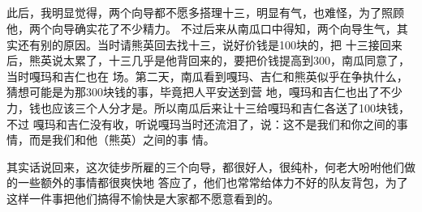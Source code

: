 ﻿\documentclass[hyperref={bookmarks=ture}xcolor=pdflatex,svgnames,table,compress]{beamer}
\begin{document}
\subsection{}
\begin{frame}
\begin{ztebox}
{\footnotesize
  此后，我明显觉得，两个向导都不愿多搭理十三，明显有气，也难怪，为了照顾他，两个向导确实花了不少精力。
  不过后来从南瓜口中得知，两个向导生气，其实还有别的原因。当时请熊英回去找十三，说好价钱是100块的，把
  十三接回来后，熊英说太累了，十三几乎是他背回来的，要把价钱提高到300，南瓜同意了，当时嘎玛和吉仁也在
  场。第二天，南瓜看到嘎玛、吉仁和熊英似乎在争执什么，猜想可能是为那300块钱的事，毕竟把人平安送到营
  地，嘎玛和吉仁也出了不少力，钱也应该三个人分才是。所以南瓜后来让十三给嘎玛和吉仁各送了100块钱，不过
  嘎玛和吉仁没有收，听说嘎玛当时还流泪了，说：这不是我们和你之间的事情，而是我们和他（熊英）之间的事
  情。
}
\end{ztebox}
\begin{ztebox}
{\footnotesize
  其实话说回来，这次徒步所雇的三个向导，都很好人，很纯朴，何老大吩咐他们做的一些额外的事情都很爽快地
  答应了，他们也常常给体力不好的队友背包，为了这样一件事把他们搞得不愉快是大家都不愿意看到的。
}
\end{ztebox}
\end{frame}


\subsection{}
\begin{frame}
\end{frame}

\subsection{}
\begin{frame}
\end{frame}

\subsection{}
\begin{frame}
\end{frame}
\end{document}
